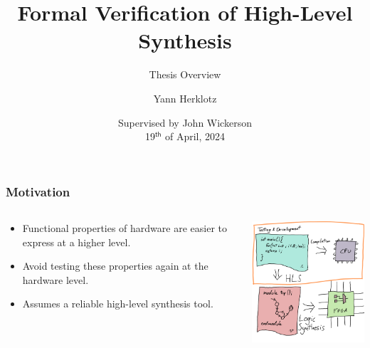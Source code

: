 \documentclass[svgnames,compress,12pt,aspectratio=169]{beamer}
\begin{document}
\title{Formal Verification of High-Level Synthesis}
\subtitle{Thesis Overview}
\author{Yann Herklotz}
\date{\small Supervised by John Wickerson \\[1em] 19$^{\mathsf{th}}$ of April, 2024}

\maketitle

\begin{frame}
  \frametitle{Motivation}

  \begin{columns}
    \begin{column}{0.5\linewidth}
      \begin{itemize}
      \item Functional properties of hardware are easier to express at a higher
        level.
      \item Avoid testing these properties again at the hardware level.
      \item Assumes a \alert{reliable} high-level synthesis tool.
      \end{itemize}
    \end{column}
    \begin{column}{0.5\linewidth}
      \includegraphics[width=6cm]{hls-flow-testing}
    \end{column}
  \end{columns}
\end{frame}
\end{document}
